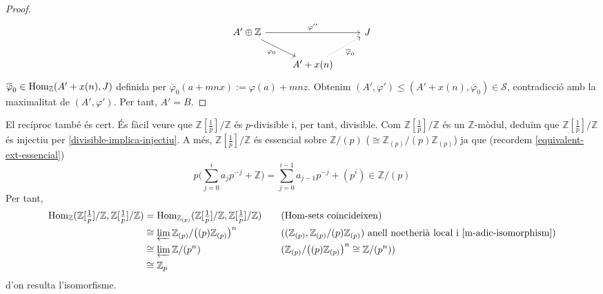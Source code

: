 \begin{proposicio}
\begin{proof}
        \begin{equation*}
        \begin{tikzcd}
            A'\oplus\mathbb{Z}
            \arrow{rr}{\varphi''}
            \arrow[swap]{rd}{\varphi_{0}}
            &&J\\
            &A'+x(n)
            \arrow[dotted, swap]{ru}{\overline{\varphi}_{0}}
        \end{tikzcd}
        \end{equation*}
        $\overline{\varphi}_{0}\in\operatorname{Hom}_{\mathbb{Z}}(A'+x(n),J)$ definida per $\overline{\varphi}_{0}(a+mnx):=\varphi(a)+mnz$. Obtenim $(A',\varphi')\leq(A'+x(n),\overline{\varphi}_{0})\in\mathcal{S}$, contradicció amb la maximalitat de $(A',\varphi')$. Per tant, $A'=B$.
    \end{proof}
\end{proposicio}
El recíproc també és cert. És fàcil veure que $\mathbb{Z}[\frac{1}{p}]/\mathbb{Z}$ és $p$-divisible i, per tant, divisible. Com $\mathbb{Z}[\frac{1}{p}]/\mathbb{Z}$ és un $\mathbb{Z}$-mòdul, deduïm que $\mathbb{Z}[\frac{1}{p}]/\mathbb{Z}$ és injectiu per \ref{divisible-implica-injectiu}.\newline
A més, $\mathbb{Z}[\frac{1}{p}]/\mathbb{Z}$ és essencial sobre $\mathbb{Z}/(p)$ ($\cong\mathbb{Z}_{(p)}/(p)\mathbb{Z}_{(p)}$) ja que (recordem \ref{equivalent-ext-essencial})
\begin{equation*}
    p\Big(\sum_{j=0}^{i}a_{j}p^{-j}+\mathbb{Z}\Big)=\sum_{j=0}^{i-1}a_{j-1}p^{-j}+(p^{i})\in\mathbb{Z}/(p)
\end{equation*}
Per tant,
    \begin{align*}
        \operatorname{Hom}_{\mathbb{Z}}(\mathbb{Z}[\tfrac{1}{p}]/\mathbb{Z},\mathbb{Z}[\tfrac{1}{p}]/\mathbb{Z})
        &=\operatorname{Hom}_{\mathbb{Z}_{(p)}}(\mathbb{Z}[\tfrac{1}{p}]/\mathbb{Z},\mathbb{Z}[\tfrac{1}{p}]/\mathbb{Z})
        &\quad&\textrm{(Hom-sets coincideixen)}\\
        &\cong\varprojlim\mathbb{Z}_{(p)}/\big((p)\mathbb{Z}_{(p)}\big)^{n}
        &\quad&\textrm{($(\mathbb{Z}_{(p)},\mathbb{Z}_{(p)}/(p)\mathbb{Z}_{(p)})$ anell noetherià local i \ref{m-adic-isomorphism})}\\
        &\cong\varprojlim\mathbb{Z}/(p^{n})
        &\quad&\textrm{($\mathbb{Z}_{(p)}/\big((p)\mathbb{Z}_{(p)}\big)^{n}\cong\mathbb{Z}/(p^{n})$)}\\
        &\cong\mathbb{Z}_{p}
    \end{align*}
d'on resulta l'isomorfisme.
